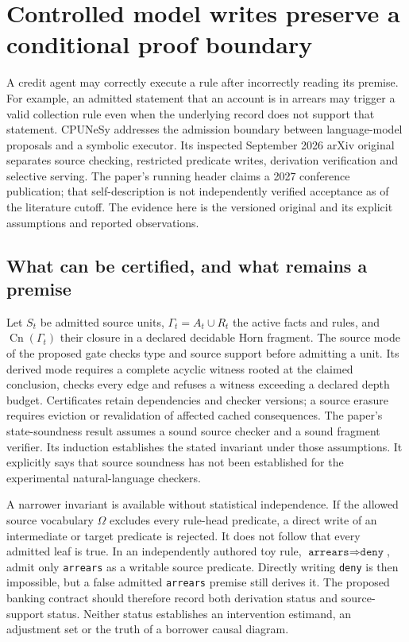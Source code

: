 \section{Controlled model writes preserve a conditional proof boundary}
\label{exec23:controlled-writes-scope}
A credit agent may correctly execute a rule after incorrectly reading its
premise. For example, an admitted statement that an account is in arrears
may trigger a valid collection rule even when the underlying record does
not support that statement. CPUNeSy addresses the admission boundary between
language-model proposals and a symbolic executor. Its inspected September
2026 arXiv original separates source checking, restricted predicate writes,
derivation verification and selective serving. The paper's running header
claims a 2027 conference publication; that self-description is not independently
verified acceptance as of the literature cutoff. The evidence here is the
versioned original and its explicit assumptions and reported observations.
\citep{exec23_controlled_writes_paper}

\subsection{What can be certified, and what remains a premise}
\label{exec23:controlled-writes-model}
Let $S_t$ be admitted source units, $\Gamma_t=A_t\cup R_t$ the active
facts and rules, and $\operatorname{Cn}(\Gamma_t)$ their closure in a
declared decidable Horn fragment. The source mode of the proposed gate
checks type and source support before admitting a unit. Its derived mode
requires a complete acyclic witness rooted at the claimed conclusion,
checks every edge and refuses a witness exceeding a declared depth budget.
Certificates retain dependencies and checker versions; a source erasure
requires eviction or revalidation of affected cached consequences. The
paper's state-soundness result assumes a sound source checker and a sound
fragment verifier. Its induction establishes the stated invariant under
those assumptions. It explicitly says that source soundness has not been
established for the experimental natural-language checkers.
\citep{exec23_controlled_writes_paper}

A narrower invariant is available without statistical independence. If the
allowed source vocabulary $\Omega$ excludes every rule-head predicate,
a direct write of an intermediate or target predicate is rejected. It does
not follow that every admitted leaf is true. In an independently authored
toy rule, $\texttt{arrears}\Rightarrow\texttt{deny}$, admit only
\texttt{arrears} as a writable source predicate. Directly writing
\texttt{deny} is then impossible, but a false admitted \texttt{arrears}
premise still derives it. The proposed banking contract should therefore
record both derivation status and source-support status. Neither status
establishes an intervention estimand, an adjustment set or the truth of a
borrower causal diagram.
\citep{exec23_controlled_writes_paper,exec23_controlled_writes_reference}

